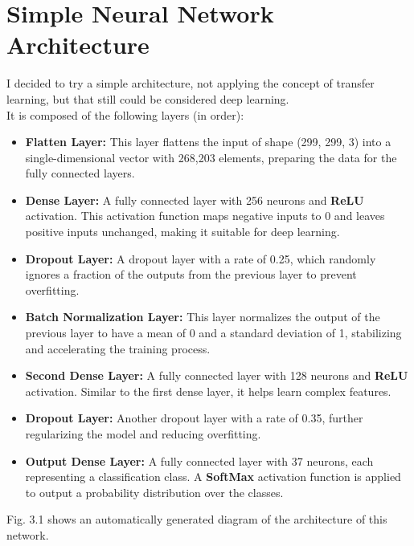 \section{Simple Neural Network Architecture}
I decided to try a simple architecture, not applying the concept of transfer learning, but that still could be considered deep learning.\\
It is composed of the following layers (in order):
\noindent
\begin{itemize}
    \item \textbf{Flatten Layer:} This layer flattens the input of shape (299, 299, 3) into a single-dimensional vector with 268,203 elements, preparing the data for the fully connected layers.

    \item \textbf{Dense Layer:} A fully connected layer with 256 neurons and \textbf{ReLU} activation. This activation function maps negative inputs to 0 and leaves positive inputs unchanged, making it suitable for deep learning.

    \item \textbf{Dropout Layer:} A dropout layer with a rate of 0.25, which randomly ignores a fraction of the outputs from the previous layer to prevent overfitting.

    \item \textbf{Batch Normalization Layer:} This layer normalizes the output of the previous layer to have a mean of 0 and a standard deviation of 1, stabilizing and accelerating the training process.

    \item \textbf{Second Dense Layer:} A fully connected layer with 128 neurons and \textbf{ReLU} activation. Similar to the first dense layer, it helps learn complex features.

    \item \textbf{Dropout Layer:} Another dropout layer with a rate of 0.35, further regularizing the model and reducing overfitting.

    \item \textbf{Output Dense Layer:} A fully connected layer with 37 neurons, each representing a classification class. A \textbf{SoftMax} activation function is applied to output a probability distribution over the classes.
\end{itemize}
Fig. 3.1 shows an automatically generated diagram of the architecture of this network.

